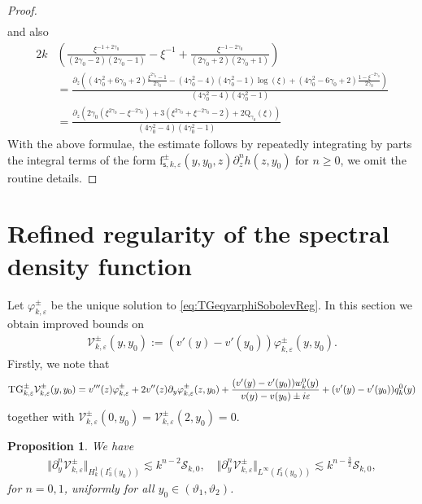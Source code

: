 \documentclass[11pt,reqno]{amsproc}
\newtheorem{proposition}{Proposition}[section]
\theoremstyle{definition}
\numberwithin{equation}{section}
\newcommand{\s}{{\mathsf{s}}}
\newcommand{\cS}{{\mathcal S}}
\newcommand{\cV}{{\mathcal{V}}}
\newcommand{\ep}{\varepsilon}
\begin{document}
\begin{proof}
\begin{align*}
\end{align*}
and also
\begin{align*}
2k& \left( \frac{\xi^{-1+2\gamma_0}}{(2\gamma_0-2)(2\gamma_0-1)}  - \xi^{-1}  + \frac{\xi^{-1-2\gamma_0}}{(2\gamma_0+2)(2\gamma_0+1)} \right) \\
&= \frac{\partial_z \left( (4\gamma_0^2 + 6\gamma_0 +2)\frac{\xi^{2\gamma_0}-1}{2\gamma_0} - (4\gamma_0^2 -4)(4\gamma_0^2-1)\log(\xi) + (4\gamma_0^2 -6\gamma_0 + 2)\frac{1-\xi^{-2\gamma_0}}{2\gamma_0} \right)}{(4\gamma_0^2-4)(4\gamma_0^2-1)} \\
&= \frac{ \partial_z \left( 2\gamma_0\left( \xi^{2\gamma_0}-\xi^{-2\gamma_0} \right) +3 \left( \xi^{2\gamma_0} +\xi^{-2\gamma_0} -2 \right) +2 \mathrm{Q}_{\gamma_0}(\xi) \right) }{(4\gamma_0^2-4)(4\gamma_0^2 - 1)}
\end{align*}
With the above formulae, the estimate follows by repeatedly integrating by parts the integral terms of the form $\mathrm{f}_{\s,k,\ep}^\pm(y,y_0,z) \partial_z^n h(z,y_0)$ for $n\geq 0$, we omit the routine details.
\end{proof}

\section{Refined regularity of the spectral density function}
Let $\varphi_{k,\ep}^\pm$ be the unique solution to \eqref{eq:TGeqvarphiSobolevReg}. In this section we obtain improved bounds on
\begin{align*}
\cV_{k,\ep}^\pm(y,y_0) := (v'(y) - v'(y_0))\varphi_{k,\ep}^\pm(y,y_0).
\end{align*}
Firstly, we note that
\begin{equation}\label{eq:TGcV}
\textsc{TG}_{k,\ep}^\pm \cV_{k,\ep}^\pm(y,y_0) = v'''(z)\varphi_{k,\ep}^\pm + 2 v''(z) \partial_y\varphi_{k,\ep}^\pm(z,y_0) + \frac{(v'(y) - v'(y_0)) w_k^0(y)}{v(y) - v(y_0) \pm i\ep} + (v'(y) - v'(y_0)) q_k^0(y)
\end{equation}
together with $\cV_{k,\ep}^\pm(0,y_0)=\cV_{k,\ep}^\pm(2,y_0)=0$. 

\begin{proposition}
We have
\begin{align*}
\Vert \partial_y^n \cV_{k,\ep}^\pm \Vert_{H_k^1(I_3^c(y_0))} \lesssim k^{n-2}\cS_{k,0}, \quad \Vert \partial_y^n \cV_{k,\ep}^\pm \Vert_{L^\infty(I_3^c(y_0))} \lesssim k^{n-\frac32}\cS_{k,0},
\end{align*}
for $n=0,1$, uniformly for all $y_0\in (\vartheta_1,\vartheta_2)$.
\end{proposition}
\end{document}
